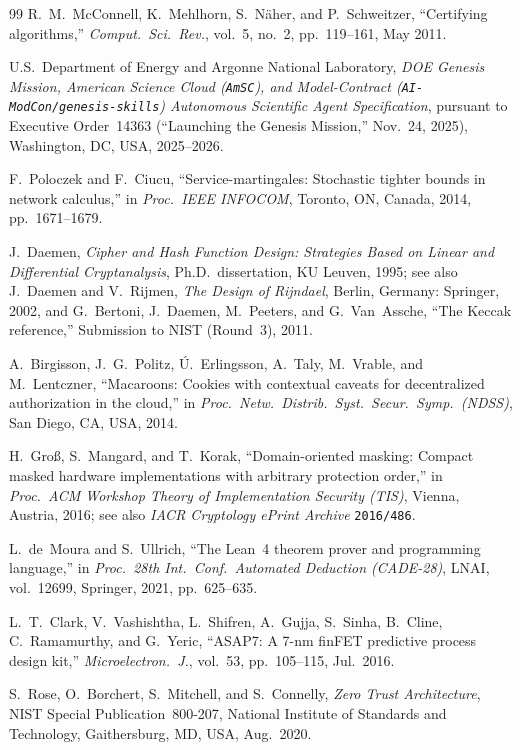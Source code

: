 \documentclass[10pt,twocolumn]{article}
\theoremstyle{spectralthm}
\begin{document}
\begin{thebibliography}{99}
R.~M.~McConnell, K.~Mehlhorn, S.~N\"{a}her, and P.~Schweitzer, ``Certifying algorithms,'' \textit{Comput.\ Sci.\ Rev.}, vol.~5, no.~2, pp.~119--161, May 2011.

U.S.\ Department of Energy and Argonne National Laboratory, \textit{DOE Genesis Mission, American Science Cloud (\texttt{AmSC}), and Model-Contract (\texttt{AI-ModCon/genesis-skills}) Autonomous Scientific Agent Specification}, pursuant to Executive Order~14363 (``Launching the Genesis Mission,'' Nov.\ 24, 2025), Washington, DC, USA, 2025--2026.

F.~Poloczek and F.~Ciucu, ``Service-martingales: Stochastic tighter bounds in network calculus,'' in \textit{Proc.\ IEEE INFOCOM}, Toronto, ON, Canada, 2014, pp.~1671--1679.

J.~Daemen, \textit{Cipher and Hash Function Design: Strategies Based on Linear and Differential Cryptanalysis}, Ph.D.\ dissertation, KU Leuven, 1995; see also J.~Daemen and V.~Rijmen, \textit{The Design of Rijndael}, Berlin, Germany: Springer, 2002, and G.~Bertoni, J.~Daemen, M.~Peeters, and G.~Van~Assche, ``The Keccak reference,'' Submission to NIST (Round~3), 2011.

A.~Birgisson, J.~G.~Politz, \'{U}.~Erlingsson, A.~Taly, M.~Vrable, and M.~Lentczner, ``Macaroons: Cookies with contextual caveats for decentralized authorization in the cloud,'' in \textit{Proc.\ Netw.\ Distrib.\ Syst.\ Secur.\ Symp.\ (NDSS)}, San Diego, CA, USA, 2014.

H.~Gro\ss, S.~Mangard, and T.~Korak, ``Domain-oriented masking: Compact masked hardware implementations with arbitrary protection order,'' in \textit{Proc.\ ACM Workshop Theory of Implementation Security (TIS)}, Vienna, Austria, 2016; see also \textit{IACR Cryptology ePrint Archive} \texttt{2016/486}.

L.~de~Moura and S.~Ullrich, ``The Lean~4 theorem prover and programming language,'' in \textit{Proc.\ 28th Int.\ Conf.\ Automated Deduction (CADE-28)}, LNAI, vol.~12699, Springer, 2021, pp.~625--635.

L.~T.~Clark, V.~Vashishtha, L.~Shifren, A.~Gujja, S.~Sinha, B.~Cline, C.~Ramamurthy, and G.~Yeric, ``ASAP7: A 7-nm finFET predictive process design kit,'' \textit{Microelectron.\ J.}, vol.~53, pp.~105--115, Jul.\ 2016.

S.~Rose, O.~Borchert, S.~Mitchell, and S.~Connelly, \textit{Zero Trust Architecture}, NIST Special Publication~800-207, National Institute of Standards and Technology, Gaithersburg, MD, USA, Aug.\ 2020.


\end{thebibliography}
\end{document}
